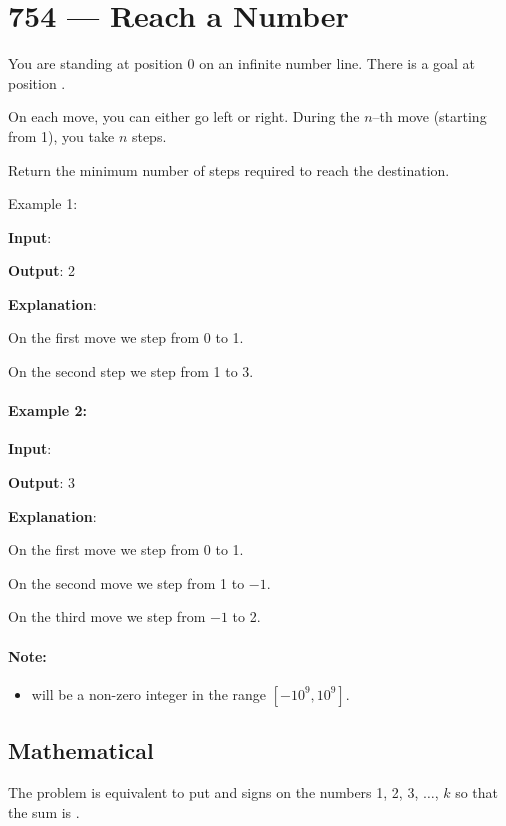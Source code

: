 \section{754 --- Reach a Number}
You are standing at position 0 on an infinite number line. There is a goal at position .

On each move, you can either go left or right. During the $n$--th move (starting from 1), you take $n$ steps.

Return the minimum number of steps required to reach the destination.

Example 1:

\begin{flushleft}
\textbf{Input}: 

\textbf{Output}: 2

\textbf{Explanation}:

On the first move we step from 0 to 1.

On the second step we step from 1 to 3.
\end{flushleft}

\paragraph{Example 2:}

\begin{flushleft}
\textbf{Input}: 

\textbf{Output}: 3

\textbf{Explanation}:

On the first move we step from 0 to 1.

On the second move we step  from 1 to $-1$.

On the third move we step from $-1$ to 2.
\end{flushleft}

\paragraph{Note:}

\begin{itemize}
\item {} will be a non-zero integer in the range $[-10^9, 10^9]$.
\end{itemize}

\subsection{Mathematical}
The problem is equivalent to put \fcj{+} and \fcj{-} signs on the numbers 1, 2, 3, $\ldots$, $k$ so that the sum is .

